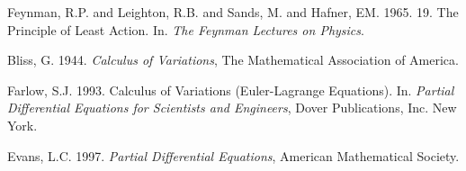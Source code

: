 \documentclass{article}
\begin{document}
\footnotesize
 \begin{thebibliography}{99}

 Feynman, R.P. and Leighton, R.B. and Sands, M. and Hafner, EM. 1965. 19. The Principle of Least Action. In. {\em
The Feynman Lectures on Physics}.

 Bliss, G. 1944. {\em
Calculus of Variations}, The Mathematical Association of America.

 Farlow, S.J. 1993. Calculus of Variations (Euler-Lagrange Equations). In. {\em Partial Differential Equations for Scientists and Engineers}, Dover Publications, Inc. New York. 

 Evans, L.C. 1997. {\em Partial Differential Equations}, American Mathematical Society. 


\end{thebibliography}



%
\end{document}
